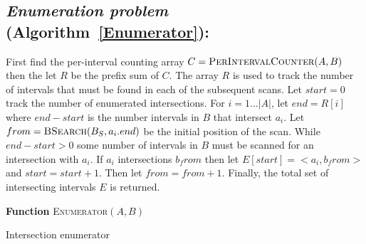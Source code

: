 \subsection{{\em Enumeration problem} (Algorithm~\ref{Enumerator}):} First find
the per-interval counting array
	 $C=\textsc{PerIntervalCounter}(A,B)$ then the let $R$ be the prefix sum
	 of $C$. The array $R$ is used to track the number of intervals that must be
	found in each of the subsequent scans.  Let $start = 0$ track the number of
	enumerated intersections.  For $i=1\dots|A|$, let $end = R[i]$ where $end -
	start$ is the number intervals in $B$ that intersect $a_i$.  Let
	$from=\textsc{BSearch}(B_S, a_i.end)$ be the initial position of the scan.
	While $end - start > 0$ some number of intervals in $B$ must be scanned for
	an intersection with $a_i$.  If $a_i$ intersections $b_from$ then let
	$E[start] = <a_i, b_from>$ and $start=start+1$.  Then let $from = from +1$.
	Finally, the total set of intersecting intervals $E$ is returned.
        
	 \begin{algorithm}[h!]
		   \DontPrintSemicolon
		   \footnotesize
		    
		   \BlankLine
		   \textbf{Function} \textsc{Enumerator}$(A,B)$
		   \caption{Intersection enumerator}
			\label{Enumerator}
	 \end{algorithm}
